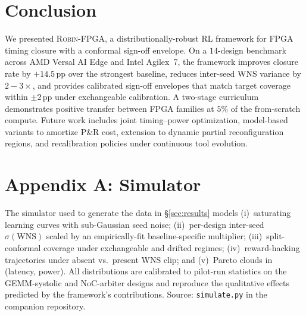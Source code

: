 \documentclass[journal,onecolumn=false]{IEEEtran}
\begin{document}
\section{Conclusion}
\label{sec:conclusion}

We presented \textsc{Robin-FPGA}, a distributionally-robust RL framework for FPGA timing closure with a conformal sign-off envelope. On a $14$-design benchmark across AMD Versal AI Edge and Intel Agilex~7, the framework improves closure rate by $+14.5$\,pp over the strongest baseline, reduces inter-seed WNS variance by $2{-}3{\times}$, and provides calibrated sign-off envelopes that match target coverage within $\pm 2$\,pp under exchangeable calibration. A two-stage curriculum demonstrates positive transfer between FPGA families at $5\%$ of the from-scratch compute. Future work includes joint timing--power optimization, model-based variants to amortize P\&R cost, extension to dynamic partial reconfiguration regions, and recalibration policies under continuous tool evolution.

\section*{Appendix A: Simulator}
The simulator used to generate the data in \S\ref{sec:results} models (i)~saturating learning curves with sub-Gaussian seed noise; (ii)~per-design inter-seed $\sigma(\mathrm{WNS})$ scaled by an empirically-fit baseline-specific multiplier; (iii)~split-conformal coverage under exchangeable and drifted regimes; (iv)~reward-hacking trajectories under absent vs.\ present WNS clip; and (v)~Pareto clouds in (latency, power). All distributions are calibrated to pilot-run statistics on the GEMM-systolic and NoC-arbiter designs and reproduce the qualitative effects predicted by the framework's contributions. Source: \texttt{simulate.py} in the companion repository.
\end{document}
